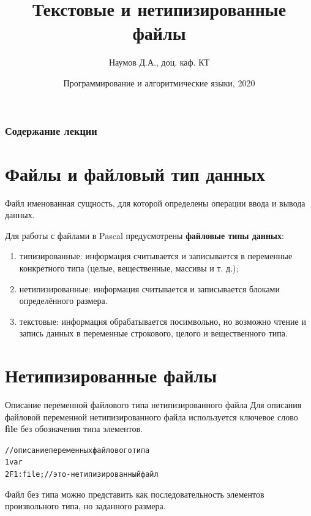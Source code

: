 \documentclass{beamer}
\title[Текстовые файлы]{Текстовые и нетипизированные файлы}
\author{Наумов Д.А., доц. каф. КТ}
\date[05.05.2020] {Программирование и алгоритмические языки, 2020}
\begin{document}
\begin{frame}
  \titlepage
\end{frame}
  
\begin{frame}
  \frametitle{Содержание лекции}
  \tableofcontents  
\end{frame}
  
\section{Файлы и файловый тип данных}

\begin{frame}
\begin{block}{Файл}
именованная сущность, для которой определены операции ввода и вывода данных.
\end{block}
Для работы с файлами в Pascal предусмотрены \textbf{файловые типы данных}:
\begin{enumerate}
\item типизированные: информация считывается и записывается в переменные конкретного типа (целые, вещественные, массивы и т. д.);
\item нетипизированные: информация считывается и записывается блоками определённого размера.
\item текстовые: информация обрабатывается посимвольно, но возможно чтение и запись данных в переменные строкового, целого и вещественного типа.
\end{enumerate}
\end{frame} 

\section{Нетипизированные файлы}

\begin{frame}
  \tableofcontents[currentsection]
\end{frame}

\begin{frame}[fragile]{Описание переменной файлового типа нетипизированного файла}
Для описания файловой переменной нетипизированного файла используется  ключевое слово \textbf{file} без обозначения типа элементов.
\begin{alltt}
//описание переменных файлового типа
1 var                  
2   F1: file; //это - нетипизированный файл
\end{alltt}
Файл без типа можно представить как последовательность элементов произвольного типа, но заданного размера.
\end{frame}
\end{document}
